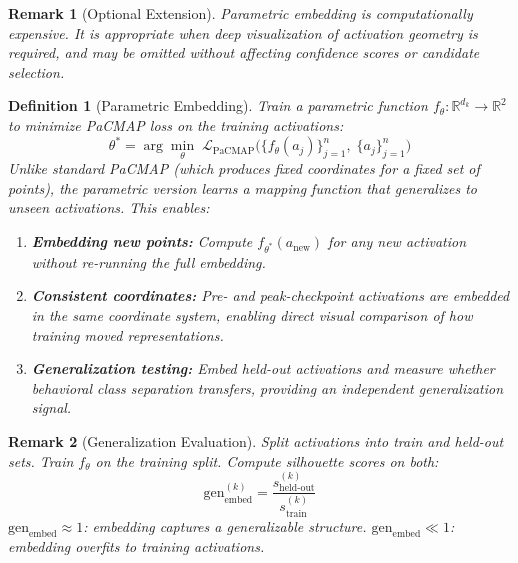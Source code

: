 \documentclass[11pt]{article}
\newtheorem{definition}{Definition}[section]
\newtheorem{remark}{Remark}[section]
\begin{document}
\begin{remark}[Optional Extension]
\label{rem:parametric-embedding-optional-extension}
Parametric embedding is computationally expensive. It is appropriate when deep visualization of activation geometry is required, and may be omitted without affecting confidence scores or candidate selection.
\end{remark}

\begin{definition}[Parametric Embedding]
\label{def:parametric-embedding}
Train a parametric function $f_\theta: \mathbb{R}^{d_k} \to \mathbb{R}^2$ to minimize PaCMAP loss on the training activations:
\begin{equation}
\theta^* = \arg\min_\theta \;\mathcal{L}_{\text{PaCMAP}}\bigl(\{f_\theta(a_j)\}_{j=1}^n,\; \{a_j\}_{j=1}^n\bigr)
\end{equation}
Unlike standard PaCMAP (which produces fixed coordinates for a fixed set of points), the parametric version learns a mapping function that generalizes to unseen activations. This enables:
\begin{enumerate}[nosep]
\item \textbf{Embedding new points:} Compute $f_{\theta^*}(a_{\text{new}})$ for any new activation without re-running the full embedding.
\item \textbf{Consistent coordinates:} Pre- and peak-checkpoint activations are embedded in the same coordinate system, enabling direct visual comparison of how training moved representations.
\item \textbf{Generalization testing:} Embed held-out activations and measure whether behavioral class separation transfers, providing an independent generalization signal.
\end{enumerate}
\end{definition}

\begin{remark}[Generalization Evaluation]
\label{rem:parametric-embedding-generalization-evaluation}
Split activations into train and held-out sets. Train $f_\theta$ on the training split. Compute silhouette scores on both:
\begin{equation}
\text{gen}_{\text{embed}}^{(k)} = \frac{s_{\text{held-out}}^{(k)}}{s_{\text{train}}^{(k)}}
\end{equation}
$\text{gen}_{\text{embed}} \approx 1$: embedding captures a generalizable structure. $\text{gen}_{\text{embed}} \ll 1$: embedding overfits to training activations.
\end{remark}
\end{document}
